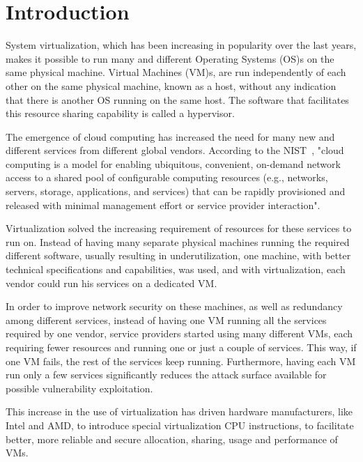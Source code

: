 \chapter{Introduction}\label{ch:intro}

System virtualization, which has been increasing in popularity over the last years, makes it possible to run many and different Operating Systems (OS)s on the same physical machine. Virtual Machines (VM)s, are run independently of each other on the same physical machine, known as a host, without any indication that there is another \ac{OS} running on the same host. The software that facilitates this resource sharing capability is called a hypervisor.

\par The emergence of cloud computing has increased the need for many new and different services from different global vendors. According to the \ac{NIST}~\cite{mell2011nist}, "cloud computing is a model for enabling ubiquitous, convenient, on-demand network access to a shared pool of configurable computing resources (e.g., networks, servers, storage, applications, and services) that can be rapidly provisioned and released with minimal management effort or service provider interaction".  

\par Virtualization solved the increasing requirement of resources for these services to run on. Instead of having many separate physical machines running the required different software, usually resulting in underutilization, one machine, with better technical specifications and capabilities, was used, and with virtualization, each vendor could run his services on a dedicated \ac{VM}. 

\par In order to improve network security on these machines, as well as redundancy among different services, instead of having one VM running all the services required by one vendor, service providers started using many different \ac{VM}s, each requiring fewer resources and running one or just a couple of services. This way, if one VM fails, the rest of the services keep running. Furthermore, having each \ac{VM} run only a few services significantly reduces the attack surface available for possible vulnerability exploitation.

\par This increase in the use of virtualization has driven hardware manufacturers, like Intel and AMD, to introduce special virtualization \ac{CPU} instructions, to facilitate better, more reliable and secure allocation, sharing, usage and performance of \ac{VM}s. 


